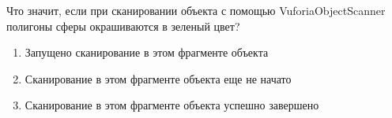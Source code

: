 
Что значит, если при сканировании объекта с помощью VuforiaObjectScanner полигоны сферы окрашиваются в зеленый цвет?

\begin{enumerate}
    \item Запущено сканирование в этом фрагменте объекта
    \item Сканирование в этом фрагменте объекта еще не начато
    \item Сканирование в этом фрагменте объекта успешно завершено
\end{enumerate}

